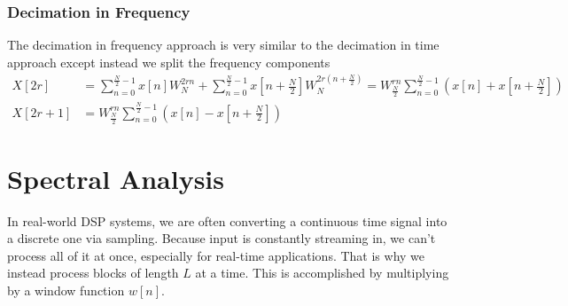 \documentclass{article}
\begin{document}
\subsubsection{Decimation in Frequency}
The decimation in frequency approach is very similar to the decimation in time approach except instead we split the frequency components
\begin{align*}
  X[2r] &= \sum_{n=0}^{\frac{N}{2}-1}x[n]W_N^{2rn}+\sum_{n=0}^{\frac{N}{2}-1}x\left[n+\frac{N}{2}\right]W_N^{2r\left(n+\frac{N}{2}\right)}=W_{\frac{N}{2}}^{rn}\sum_{n=0}^{\frac{N}{2}-1}\left(x[n]+x\left[n+\frac{N}{2}\right]\right)\\
  X[2r+1] &= W_{\frac{N}{2}}^{rn}\sum_{n=0}^{\frac{N}{2}-1}\left(x[n]-x\left[n+\frac{N}{2}\right]\right)
\end{align*}
\section{Spectral Analysis}
\begin{figure}[H]
  \centering
\end{figure}
In real-world DSP systems, we are often converting a continuous time signal into a discrete one via sampling.
Because input is constantly streaming in, we can't process all of it at once, especially for real-time applications.
That is why we instead process blocks of length $L$ at a time. This is accomplished by multiplying by a window function $w[n]$.
\end{document}
